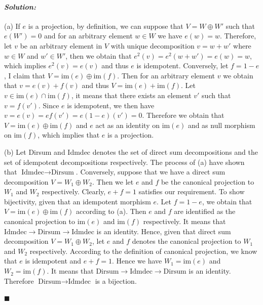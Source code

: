 \documentclass[12pt, a4paper]{article}
\theoremstyle{remark}
\newenvironment{solution}
  {\paragraph{\textit{Solution:}}\par\medskip}
  {\hfill$\blacksquare$\vspace{0.1cm}}
\begin{document}
\begin{solution}
    (a) If $e$ is a projection, by definition, we can suppose that $V=W\oplus W'$ such that $e(W')=0$ and for an arbitrary element $w\in W$ we have $e(w)=w$.
    Therefore, let $v$ be an arbitrary element in $V$ with unique decomposition $v=w+w'$ where $w\in W$ and $w'\in W'$, then we obtain that $e^2(v)=e^2(w+w')=e(w)=w$, which implies $e^2(v)=e(v)$ and thus $e$ is idempotent.
    Conversely, let $f=1-e$, I claim that $V=\text{im}(e)\oplus \text{im}(f)$. Then for an arbitrary element $v$ we obtain that $v=e(v)+f(v)$ and thus $V=\text{im}(e)+\text{im}(f)$.
    Let $v\in\text{im}(e)\cap \text{im}(f)$, it means that there exists an element $v'$ such that $v=f(v')$. Since $e$ is idempotent, we then have $v=e(v)=ef(v')=e(1-e)(v')=0$. Therefore we obtain that $V=\text{im}(e)\oplus\text{im}(f)$
    and $e$ act as an identity on $\text{im}(e)$ and as null morphism on $\text{im}(f)$, which implies that $e$ is a projection.

    (b) Let Dirsum and Idmdec denotes the set of direct sum decompositions and the set of idempotent decompositions respectively.
    The process of (a) have shown that $\text{Idmdec}\to \text{Dirsum}$. Conversely, suppose that we have a direct sum decomposition $V=W_1\oplus W_2$. 
    Then we let $e$ and $f$ be the canonical projection to $W_1$ and $W_2$ respectively. Clearly, $e+f=1$ satisfies our requirement.
    To show bijectivity, given that an idempotent morphism $e$. Let $f=1-e$, we obtain that $V=\text{im}(e)\oplus \text{im}(f)$ according to (a).
    Then $e$ and $f$ are identified as the canonical projection to $\text{im}(e)$ and $\text{im}(f)$ respectively. It means that $\text{Idmdec}\to \text{Dirsum}\to \text{Idmdec}$ is an identity.
    Hence, given that direct sum decomposition $V=W_1\oplus W_2$, let $e$ and $f$ denotes the canonical projection to $W_1$ and $W_2$ respectively.
    According to the definition of canonical projection, we know that $e$ is idempotent and $e+f=1$. 
    Hence we have $W_1=\text{im}(e)$ and $W_2=\text{im}(f)$.
    It means that $\text{Dirsum}\to \text{Idmdec}\to \text{Dirsum}$ is an identity.
    Therefore $\text{Dirsum}\to \text{Idmdec}$ is a bijection.


\end{solution}
\end{document}
